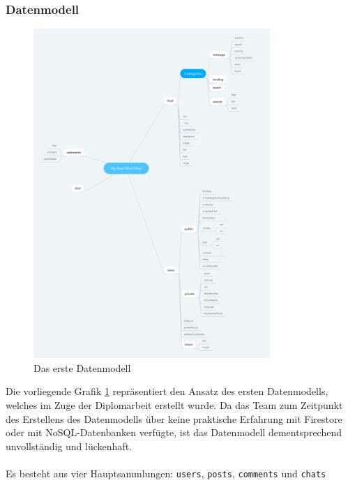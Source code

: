 \subsubsection{Datenmodell}

\begin{figure}[h]
  \centering
  \includegraphics[width=0.8\textwidth]{pics/nochba-erd-old.png}
  \caption{Das erste Datenmodell}
  \label{fig:old-erd}
\end{figure}

Die vorliegende Grafik \ref{fig:old-erd} repräsentiert den Ansatz des ersten Datenmodells, welches im Zuge der Diplomarbeit erstellt wurde. Da das Team zum Zeitpunkt des Erstellens des Datenmodells über keine praktische Erfahrung mit Firestore oder mit NoSQL-Datenbanken verfügte, ist das Datenmodell dementsprechend unvollständig und lückenhaft.
\\\\
Es besteht aus vier Hauptsammlungen: \texttt{users}, \texttt{posts}, \texttt{comments} und \texttt{chats}
\\\\
